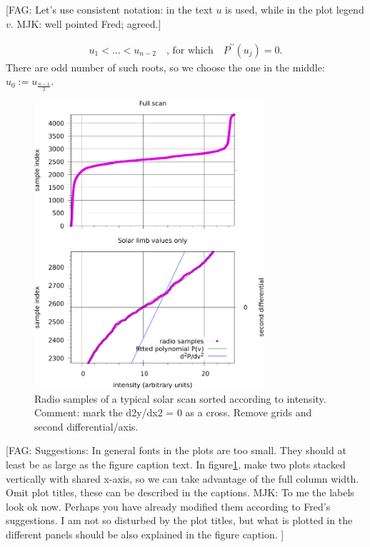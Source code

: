 \documentclass{aa}
\newcommand{\fag}[1]{\textcolor{midpurple}{[FAG: #1]}} %
\newcommand{\eqnl}[2]{\begin{eqnarray}\label{#1}#2\end{eqnarray}}
\begin{document}
\fag{Let's use consistent notation: in the text $u$ is used, while in the plot legend $v$. MJK: well pointed Fred; agreed.}

\eqnl{scurve-roots}{
u_1 < ... < u_{n-2} \quad \text{, for which} \quad P^{\prime\prime}(u_j) = 0 \text{.}
}
There are odd number of such roots, so we choose the one in the middle: $u_0 := u_{\frac{n-1}{2}}$.
\begin{figure}
\centering
\includegraphics[width=8.5cm]{Scurve_example.png}
\caption{Radio samples of a typical solar scan sorted according to intensity. Comment: mark the d2y/dx2 = 0 as a cross. 
Remove grids and second differential/axis.}
\label{S-curve_example}
\end{figure}

\fag{Suggestions: In general fonts in the plots are too small. They should at least be as large as the figure caption text. In figure\ref{S-curve_example}, make two plots stacked vertically with shared x-axis, so we can take advantage of the full column width.
Omit plot titles, these can be described in the captions. MJK: To me the labels look ok now. Perhaps you have already modified them according to Fred's suggestions. I am not so disturbed by the plot titles, but what is plotted in the different panels should be also explained in the figure caption. }
\end{document}

